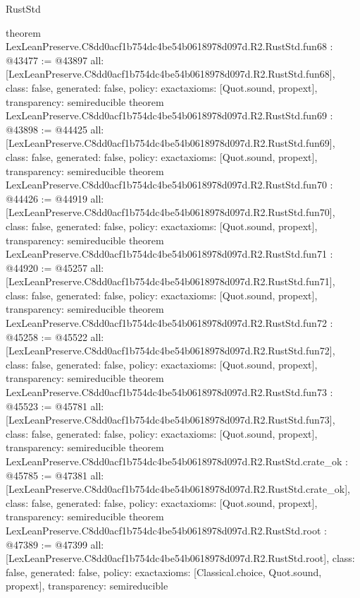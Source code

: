 \begin{lexlean}{RustStd}
\begin{coremodule}
{}
theorem LexLeanPreserve.C8dd0acf1b754dc4be54b0618978d097d.R2.RustStd.fun68 : @43477 := @43897 {
  all: [LexLeanPreserve.C8dd0acf1b754dc4be54b0618978d097d.R2.RustStd.fun68],
  class: false,
  generated: false,
  policy: exact{axioms: [Quot.sound, propext]},
  transparency: semireducible
}
theorem LexLeanPreserve.C8dd0acf1b754dc4be54b0618978d097d.R2.RustStd.fun69 : @43898 := @44425 {
  all: [LexLeanPreserve.C8dd0acf1b754dc4be54b0618978d097d.R2.RustStd.fun69],
  class: false,
  generated: false,
  policy: exact{axioms: [Quot.sound, propext]},
  transparency: semireducible
}
theorem LexLeanPreserve.C8dd0acf1b754dc4be54b0618978d097d.R2.RustStd.fun70 : @44426 := @44919 {
  all: [LexLeanPreserve.C8dd0acf1b754dc4be54b0618978d097d.R2.RustStd.fun70],
  class: false,
  generated: false,
  policy: exact{axioms: [Quot.sound, propext]},
  transparency: semireducible
}
theorem LexLeanPreserve.C8dd0acf1b754dc4be54b0618978d097d.R2.RustStd.fun71 : @44920 := @45257 {
  all: [LexLeanPreserve.C8dd0acf1b754dc4be54b0618978d097d.R2.RustStd.fun71],
  class: false,
  generated: false,
  policy: exact{axioms: [Quot.sound, propext]},
  transparency: semireducible
}
theorem LexLeanPreserve.C8dd0acf1b754dc4be54b0618978d097d.R2.RustStd.fun72 : @45258 := @45522 {
  all: [LexLeanPreserve.C8dd0acf1b754dc4be54b0618978d097d.R2.RustStd.fun72],
  class: false,
  generated: false,
  policy: exact{axioms: [Quot.sound, propext]},
  transparency: semireducible
}
theorem LexLeanPreserve.C8dd0acf1b754dc4be54b0618978d097d.R2.RustStd.fun73 : @45523 := @45781 {
  all: [LexLeanPreserve.C8dd0acf1b754dc4be54b0618978d097d.R2.RustStd.fun73],
  class: false,
  generated: false,
  policy: exact{axioms: [Quot.sound, propext]},
  transparency: semireducible
}
theorem LexLeanPreserve.C8dd0acf1b754dc4be54b0618978d097d.R2.RustStd.crate_ok : @45785 := @47381 {
  all: [LexLeanPreserve.C8dd0acf1b754dc4be54b0618978d097d.R2.RustStd.crate_ok],
  class: false,
  generated: false,
  policy: exact{axioms: [Quot.sound, propext]},
  transparency: semireducible
}
theorem LexLeanPreserve.C8dd0acf1b754dc4be54b0618978d097d.R2.RustStd.root : @47389 := @47399 {
  all: [LexLeanPreserve.C8dd0acf1b754dc4be54b0618978d097d.R2.RustStd.root],
  class: false,
  generated: false,
  policy: exact{axioms: [Classical.choice, Quot.sound, propext]},
  transparency: semireducible
}


\end{coremodule}
\end{lexlean}
